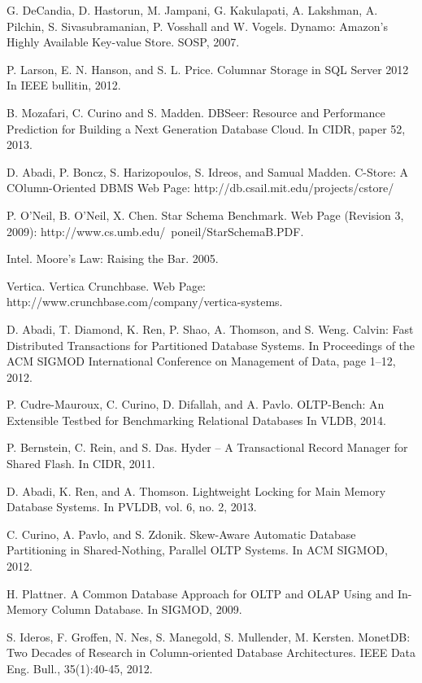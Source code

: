 \begin{thebibliography}{1}
G. DeCandia, D. Hastorun, M. Jampani, G. Kakulapati, A. Lakshman, A. Pilchin, S. Sivasubramanian, P. Vosshall and W. Vogels.
Dynamo: Amazon's Highly Available Key-value Store.
SOSP, 2007.


P. Larson, E. N. Hanson, and S. L. Price.
Columnar Storage in SQL Server 2012
In IEEE bullitin, 2012.


B. Mozafari, C. Curino and S. Madden.
DBSeer: Resource and Performance Prediction for Building a Next Generation Database Cloud.
In CIDR, paper 52, 2013.

D. Abadi, P. Boncz, S. Harizopoulos, S. Idreos, and Samual Madden.
C-Store: A COlumn-Oriented DBMS
Web Page: http://db.csail.mit.edu/projects/cstore/


P. O'Neil, B. O'Neil, X. Chen.
Star Schema Benchmark.
Web Page (Revision 3, 2009): http://www.cs.umb.edu/~poneil/StarSchemaB.PDF.


Intel.
Moore's Law: Raising the Bar.
2005.


Vertica.
Vertica Crunchbase.
Web Page: http://www.crunchbase.com/company/vertica-systems.

D. Abadi, T. Diamond, K. Ren, P. Shao, A. Thomson, and S. Weng.
Calvin: Fast Distributed Transactions for Partitioned Database Systems. 
In Proceedings of the ACM SIGMOD International Conference on Management of Data, page 1–12, 2012.

P. Cudre-Mauroux, C. Curino, D. Difallah, and A. Pavlo.
OLTP-Bench: An Extensible Testbed for Benchmarking Relational Databases
In VLDB, 2014.

P. Bernstein, C. Rein, and S. Das. 
Hyder – A Transactional Record Manager for Shared Flash. 
In CIDR, 2011.

D. Abadi, K. Ren, and A. Thomson.
Lightweight Locking for Main Memory Database Systems.
In PVLDB, vol. 6, no. 2, 2013.

C. Curino, A. Pavlo, and S. Zdonik.
Skew-Aware Automatic Database Partitioning in Shared-Nothing, Parallel OLTP Systems.
In ACM SIGMOD, 2012.

H. Plattner.
A Common Database Approach for OLTP and OLAP Using and In-Memory Column Database.
In SIGMOD, 2009.

S. Ideros, F. Groffen, N. Nes, S. Manegold, S. Mullender, M. Kersten.
MonetDB: Two Decades of Research in Column-oriented Database Architectures.
IEEE Data Eng. Bull., 35(1):40-45, 2012.





\end{thebibliography}


